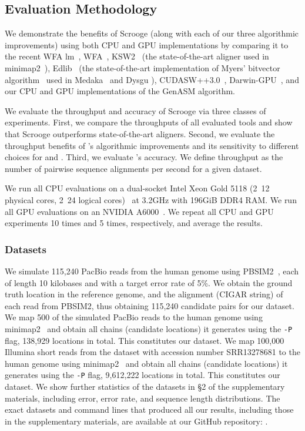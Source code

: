 \subsection{Evaluation Methodology}
We demonstrate the benefits of Scrooge (along with each of our three algorithmic improvements) using both CPU and GPU implementations by comparing it to the recent  WFA lm~\citep{Eizenga2022wfalm}, WFA~\citep{wfa_algorithm}, KSW2~\citep{ksw2_a} (the state-of-the-art aligner used in minimap2~\citep{ksw2_b}), Edlib~\citep{edlib} (the state-of-the-art implementation of Myers' bitvector algorithm~\citep{myers_algorithm_1999} used in Medaka~\citep{medaka} and Dysgu \citep{cleal2022dysgu}), CUDASW++3.0~\citep{liu2013cudasw++}, Darwin-GPU~\citep{ahmed2020darwin_gpu}, and our CPU and GPU implementations of the GenASM algorithm.

We evaluate the throughput and accuracy of Scrooge via three classes of experiments. First, we compare the throughputs of all evaluated tools and show that Scrooge outperforms state-of-the-art aligners. Second, we evaluate the throughput benefits of \toolname's algorithmic improvements and its sensitivity to different choices for  and . Third, we evaluate \toolname's accuracy. %
We define throughput as the number of pairwise sequence alignments per second for a given dataset.


We run all CPU evaluations on a dual-socket Intel Xeon Gold 5118 (2\x~12 physical cores, 2\x~24 logical cores)~\citep{xeon_gold_5118} at 3.2GHz with 196GiB DDR4 RAM. We run all GPU evaluations on an NVIDIA A6000~\citep{A6000}. We repeat all CPU and GPU experiments 10 times and 5 times, respectively, and average the results.

\subsubsection{Datasets}
We simulate 115,240 PacBio reads from the human genome using PBSIM2~\citep{pbsim2}, each of length 10 kilobases and with a target error rate of 5\%. We obtain the ground truth location in the reference genome, and the alignment (CIGAR string) of each read from PBSIM2, thus obtaining 115,240 candidate pairs for our  dataset. We map 500 of the simulated PacBio reads to the human genome using minimap2~\citep{ksw2_b} and obtain all chains (candidate locations) it generates using the \texttt{-P} flag, 138,929 locations in total. This constitutes our  dataset. We map 100,000 Illumina short reads from the dataset with accession number SRR13278681 to the human genome using minimap2~\citep{ksw2_b} and obtain all chains (candidate locations) it generates using the \texttt{-P} flag, 9,612,222 locations in total. This constitutes our  dataset.
We show further statistics of the datasets in \S2 of the supplementary materials, including error, error rate, and sequence length distributions. The exact datasets and command lines that produced all our results, including those in the supplementary materials, are available at our GitHub repository: \gitrepo.


